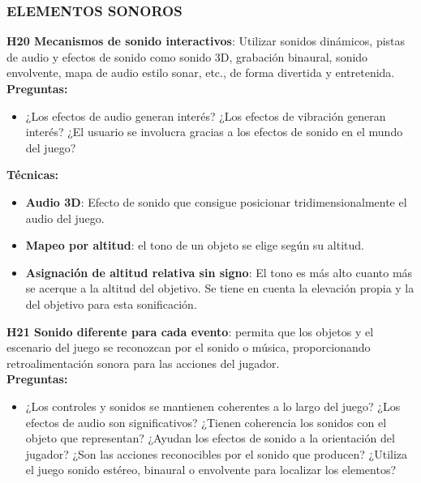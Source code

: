 \subsubsection{ELEMENTOS SONOROS}

\textbf{H20 Mecanismos de sonido interactivos}: Utilizar sonidos dinámicos, pistas de audio y efectos de sonido como sonido 3D, grabación binaural, sonido envolvente, mapa de audio estilo sonar, etc., de forma divertida y entretenida. \cite{teixeiraborgesFairPlayGuidelines2018a}\\
\textbf{Preguntas:}
\begin{itemize}
	\item   ¿Los efectos de audio generan interés? ¿Los efectos de vibración generan interés? ¿El usuario se involucra gracias a los efectos de sonido en el mundo del juego?
\end{itemize}
\textbf{Técnicas:}
\begin{itemize}
	\item \textbf{Audio 3D}: Efecto de sonido que consigue posicionar tridimensionalmente el audio del juego. \cite{LibroBlancoAccesibilidad} 
	\item \textbf{Mapeo por altitud}: el tono de un objeto se elige según su altitud. \cite{agrimiGameAccessibilityVisually2024}
	\item \textbf{Asignación de altitud relativa sin signo}: El tono es más alto cuanto más se acerque a la altitud del objetivo. Se tiene en cuenta la elevación propia y la del objetivo para esta sonificación. \cite{agrimiGameAccessibilityVisually2024}
\end{itemize}
\textbf{H21 Sonido diferente para cada evento}: permita que los objetos y el escenario del juego se reconozcan por el sonido o música, proporcionando retroalimentación sonora para las acciones del jugador. \cite{deborbacamposUsabilityAccessibilityGameplay2016} \cite{jimenezhurtadoDimensionsSubdimensionsEQUIT2025} \cite{teixeiraborgesFairPlayGuidelines2018a}\\
\textbf{Preguntas:}
\begin{itemize}
	\item  ¿Los controles y sonidos se mantienen coherentes a lo largo del juego?  ¿Los efectos de audio son significativos? ¿Tienen coherencia los sonidos con el objeto que representan? ¿Ayudan los efectos de sonido a la orientación del jugador? ¿Son las acciones reconocibles por el sonido que producen? ¿Utiliza el juego sonido estéreo, binaural o envolvente para localizar los elementos?
\end{itemize}
